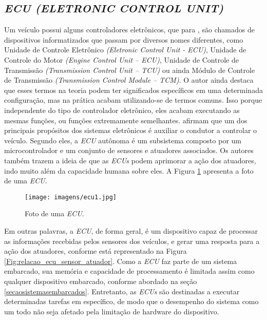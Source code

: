 \subsection{\textit{ECU (ELETRONIC CONTROL UNIT)}}
Um veículo possui alguns controladores eletrônicos, que para , são chamados de dispositivos informatizados que passam por diversos nomes diferentes, como Unidade de Controle Eletrônico \textit{(Eletronic Control Unit - ECU)}, Unidade de Controle do Motor \textit{(Engine Control Unit – ECU)}, Unidade de Controle de Transmissão \textit{(Transmission Control Unit – TCU)} ou ainda Módulo de Controle de Transmissão \textit{(Transmission Control Module – TCM)}. O autor ainda destaca que esses termos na teoria podem ter significados específicos em uma determinada configuração, mas na prática acabam utilizando-se de termos comuns. Isso porque independente do tipo de controlador eletrônico, eles acabam executando as mesmas funções, ou funções extremamente semelhantes.  afirmam que um dos principais propósitos dos sistemas eletrônicos é auxiliar o condutor a controlar o veículo. Segundo eles, a \textit{ECU} autônoma é um subsistema composto por um microcontrolador e um conjunto de sensores e atuadores associados. Os autores também trazem a ideia de que as \textit{ECUs} podem aprimorar a ação dos atuadores, indo muito além da capacidade humana sobre eles. A Figura \ref{Fig:ecu} apresenta a foto de uma \textit{ECU}.

\begin{figure}[!ht]
\centering
\caption{Foto de uma \textit{ECU}.} 
{\texttt{[image: imagens/ecu1.jpg]}}\\
 \label{Fig:ecu}
\end{figure}

Em outras palavras, a \textit{ECU}, de forma geral, é um dispositivo capaz de processar as informações recebidas pelos sensores dos veículos, e gerar uma resposta para a ação dos atuadores, conforme está representado na Figura \ref{Fig:relacao_ecu_sensor_atuador}. Como a \textit{ECU} faz parte de um sistema embarcado, sua memória e capacidade de processamento é limitada assim como qualquer dispositivo embarcado, conforme abordado na seção \ref{secaosistemasembarcados}. Entretanto, as \textit{ECUs} são destinadas a executar determinadas tarefas em específico, de modo que o desempenho do sistema como um todo não seja afetado pela limitação de hardware do dispositivo.

